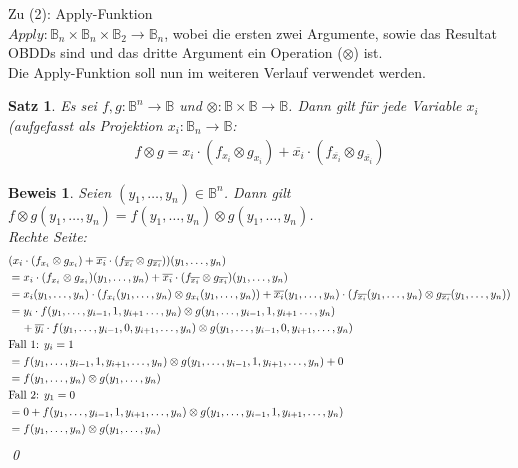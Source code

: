 \documentclass[ngerman]{scrartcl}
\theoremstyle{custom}
\newtheorem{ms}[mdef]{Satz}
\newtheorem*{bw}{Beweis}
\newcommand{\0}{\mathbf{0}}
\newcommand{\1}{\mathbf{L}}
\newcommand{\bol}{\mathds{B}^n \rightarrow \mathds{B}}
\begin{document}
Zu (2): Apply-Funktion\\
$Apply: \mathds{B}_n \times \mathds{B}_n \times \mathds{B}_2
\rightarrow \mathds{B}_n$, wobei die ersten zwei Argumente, sowie das
Resultat OBDDs sind und das dritte Argument ein Operation ($\otimes$)
ist.\\
Die Apply-Funktion soll nun im weiteren Verlauf verwendet werden.

\begin{ms}
Es sei $f,g: \bol$ und $\otimes: \mathds{B} \times \mathds{B}
\rightarrow \mathds{B}$. Dann gilt f\"ur jede Variable $x_i$
(aufgefasst als Projektion $x_i: \mathds{B}_n \rightarrow \mathds{B}$: 
\begin{align*}
f \otimes g = x_i \cdot (f_{x_i} \otimes g_{x_i}) + \overline{x_i}
\cdot (f_{\overline{x_i}} \otimes g_{\overline{x_i}})
\end{align*}
\end{ms}

\begin{bw}
Seien $(y_1, \dots, y_n) \in \mathds{B}^n$. Dann gilt $f \otimes
g(y_1,\dots,y_n) = f(y_1,\dots,y_n) \otimes g(y_1,\dots,y_n)$.\\

Rechte Seite:\\
\begin{align*}
&(x_i \cdot (f_{x_i} \otimes g_{x_i}) + \overline{x_i} \cdot
(f_{\overline{x_i}} \otimes g_{\overline{x_i}}))(y_1,\dots,y_n) \\
&= x_i \cdot (f_{x_i} \otimes g_{x_i})(y_1,\dots,y_n) + \overline{x_i} \cdot
(f_{\overline{x_i}} \otimes g_{\overline{x_i}})(y_1,\dots,y_n)\\
&= x_i(y_1,\dots,y_n) \cdot (f_{x_i}(y_1,\dots,y_n) \otimes g_{x_i}(y_1,\dots,y_n)) +
\overline{x_i}(y_1,\dots,y_n) \cdot (f_{\overline{x_i}}(y_1,\dots,y_n) \otimes
g_{\overline{x_i}}(y_1,\dots,y_n))\\
&= y_i \cdot f(y_1,\dots,y_{i-1},1,y_{i+1}\dots,y_n) \otimes
g(y_1,\dots,y_{i-1},1,y_{i+1}\dots,y_n) 
\\&\hspace{0.4cm} + \overline{y_i} \cdot
f(y_1,\dots,y_{i-1},0,y_{i+1},\dots,y_n) \otimes
g(y_1,\dots,y_{i-1},0,y_{i+1},\dots,y_n)\\
&\text{Fall 1: } y_i = 1\\
&= f(y_1,\dots,y_{i-1},1,y_{i+1},\dots,y_n) \otimes
g(y_1,\dots,y_{i-1},1,y_{i+1},\dots,y_n) + 0\\
&= f(y_1,\dots,y_n) \otimes g(y_1,\dots,y_n)\\
&\text{Fall 2: } y_1 = 0\\
&= 0 + f(y_1,\dots,y_{i-1},1,y_{i+1},\dots,y_n) \otimes
g(y_1,\dots,y_{i-1},1,y_{i+1},\dots,y_n)\\
&= f(y_1,\dots,y_n) \otimes g(y_1,\dots,y_n)\\
\end{align*}
\qed
\end{bw}
\end{document}
